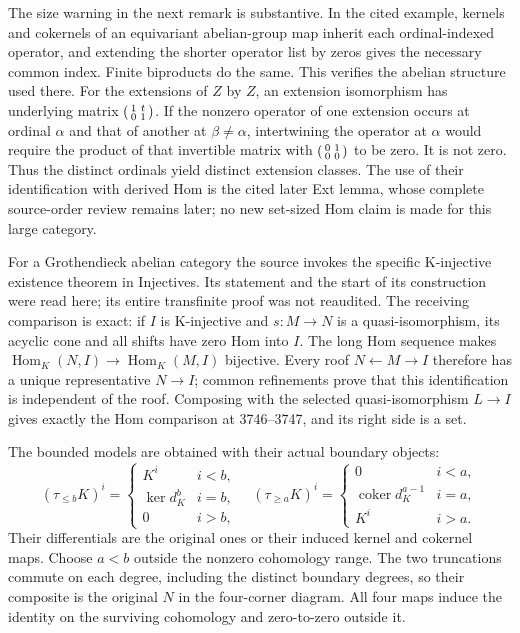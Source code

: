 \documentclass[11pt]{article}
\begin{document}
The size warning in the next remark is substantive. In the cited example,\allowbreak{} kernels and cokernels of an equivariant abelian-group map inherit each ordinal-indexed operator,\allowbreak{} and extending the shorter operator list by zeros gives the necessary common index. Finite biproducts do the same. This verifies the abelian structure used there. For the extensions of \(Z\) by \(Z\),\allowbreak{} an extension isomorphism has underlying matrix \(\begin{psmallmatrix}1&t\\0&1\end{psmallmatrix}\). If the nonzero operator of one extension occurs at ordinal \(\alpha\) and that of another at \(\beta\ne\alpha\),\allowbreak{} intertwining the operator at \(\alpha\) would require the product of that invertible matrix with \(\begin{psmallmatrix}0&1\\0&0\end{psmallmatrix}\) to be zero. It is not zero. Thus the distinct ordinals yield distinct extension classes. The use of their identification with derived Hom is the cited later Ext lemma,\allowbreak{} whose complete source-order review remains later; no new set-sized Hom claim is made for this large category.

For a Grothendieck abelian category the source invokes the specific K-injective existence theorem in Injectives. Its statement and the start of its construction were read here; its entire transfinite proof was not reaudited. The receiving comparison is exact:\allowbreak{} if \(I\) is K-injective and \(s:M\to N\) is a quasi-isomorphism,\allowbreak{} its acyclic cone and all shifts have zero Hom into \(I\). The long Hom sequence makes \(\operatorname{Hom}_K(N,I)\to\operatorname{Hom}_K(M,I)\) bijective. Every roof \(N\leftarrow M\to I\) therefore has a unique representative \(N\to I\); common refinements prove that this identification is independent of the roof. Composing with the selected quasi-isomorphism \(L\to I\) gives exactly the Hom comparison at 3746–\allowbreak{}3747,\allowbreak{} and its right side is a set.

The bounded models are obtained with their actual boundary objects:\allowbreak{} \[
(\tau_{\leq b}K)^i=
\begin{cases}K^i&i<b,\\\ker d_K^b&i=b,\\0&i>b,\end{cases}
\quad
(\tau_{\geq a}K)^i=
\begin{cases}0&i<a,\\\operatorname{coker}d_K^{a-1}&i=a,\\K^i&i>a.
\end{cases}
\] Their differentials are the original ones or their induced kernel and cokernel maps. Choose \(a<b\) outside the nonzero cohomology range. The two truncations commute on each degree,\allowbreak{} including the distinct boundary degrees,\allowbreak{} so their composite is the original \(N\) in the four-corner diagram. All four maps induce the identity on the surviving cohomology and zero-to-zero outside it.
\end{document}

